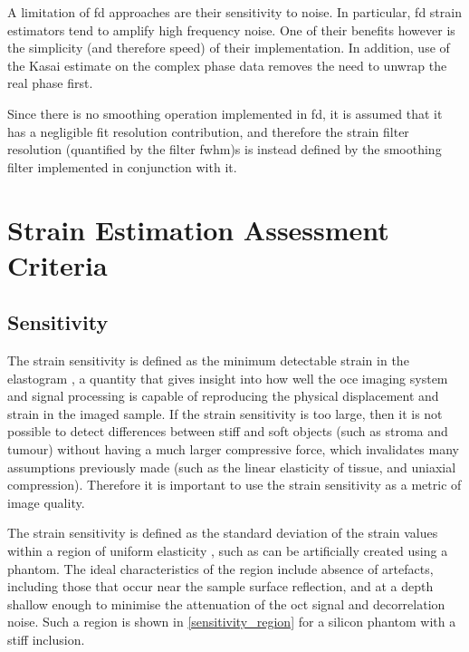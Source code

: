 A limitation of \ac{fd} approaches are their sensitivity to noise. In particular, \ac{fd} strain estimators tend to amplify high frequency noise. One of their benefits however is the simplicity (and therefore speed) of their implementation. In addition, use of the Kasai estimate on the complex phase data removes the need to unwrap the real phase first.

Since there is no smoothing operation implemented in \ac{fd}, it is assumed that it has a negligible fit resolution contribution, and therefore the strain filter resolution (quantified by the filter \ac{fwhm})s is instead defined by the smoothing filter implemented in conjunction with it.

\section{Strain Estimation Assessment Criteria}\label{criteria}

\subsection{Sensitivity}
The strain sensitivity is defined as the minimum detectable strain in the elastogram \cite{kennedy_strain_2012}, a quantity that gives insight into how well the \ac{oce} imaging system and signal processing is capable of reproducing the physical displacement and strain in the imaged sample. If the strain sensitivity is too large, then it is not possible to detect differences between stiff and soft objects (such as stroma and tumour) without having a much larger compressive force, which invalidates many assumptions previously made (such as the linear elasticity of tissue, and uniaxial compression). Therefore it is important to use the strain sensitivity as a metric of image quality. 

The strain sensitivity is defined as the standard deviation of the strain values within a region of uniform elasticity \cite{varghese_theoretical_1997}, such as can be artificially created using a phantom. The ideal characteristics of the region include absence of artefacts, including those that occur near the sample surface reflection, and at a depth shallow enough to minimise the attenuation of the \ac{oct} signal and decorrelation noise. Such a region is shown in \autoref{sensitivity_region} for a silicon phantom with a stiff inclusion.

